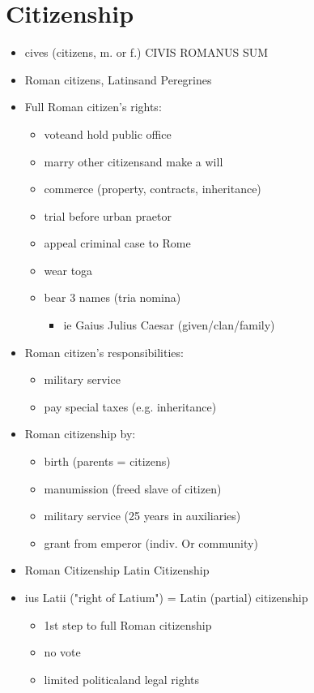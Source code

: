 \documentclass[12pt, twoside]{article}
\begin{document}
\section{Citizenship}
\begin{itemize}
\item cives (citizens, m. or f.) CIVIS ROMANUS SUM
\item Roman citizens, Latinsand Peregrines
\item Full Roman citizen's rights:
	\begin{itemize}
	\item voteand hold public office
	\item marry other citizensand make a will
	\item commerce (property, contracts, inheritance)
	\item trial before urban praetor
	\item appeal criminal case to Rome
	\item wear toga
	\item bear 3 names (tria nomina)
		\begin{itemize}
	    \item ie Gaius Julius Caesar (given/clan/family)
	    \end{itemize}
	\end{itemize}
\item Roman citizen's responsibilities:
	\begin{itemize}
	\item military service
	\item pay special taxes (e.g. inheritance)
	\end{itemize}
\item Roman citizenship by: 
	\begin{itemize}
	\item birth (parents = citizens)
	\item manumission (freed slave of citizen)
	\item military service (25 years in auxiliaries)
	\item grant from emperor (indiv. Or community)\
	\end{itemize}
\item Roman Citizenship Latin Citizenship
\item ius Latii ("right of Latium") = Latin (partial) citizenship
	\begin{itemize}
	\item 1st step to full Roman citizenship
	\item no vote
	\item limited politicaland legal rights

\end{itemize}
\end{itemize}
\end{document}
